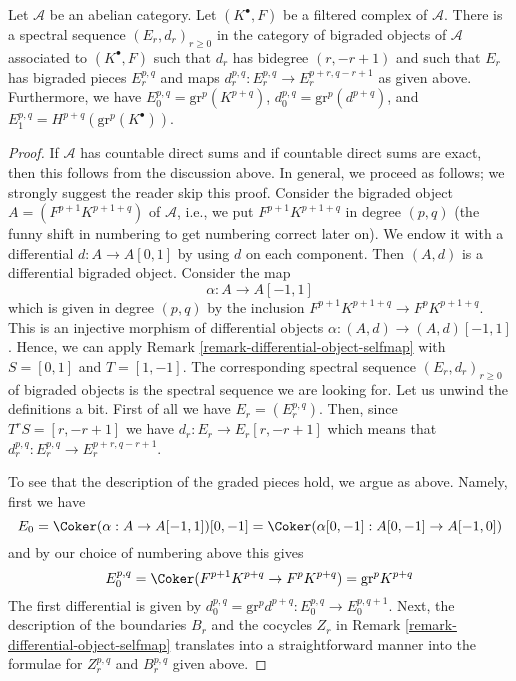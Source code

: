 \begin{lemma}
\label{lemma-spectral-sequence-filtered-complex}
Let $\mathcal{A}$ be an abelian category. Let $(K^\bullet, F)$ be a
filtered complex of $\mathcal{A}$. There is a spectral sequence
$(E_r, d_r)_{r \geq 0}$ in the category of bigraded objects of $\mathcal{A}$
associated to $(K^\bullet, F)$ such that $d_r$ has bidegree $(r, - r + 1)$
and such that $E_r$ has bigraded pieces $E_r^{p, q}$ and maps
$d_r^{p, q} : E_r^{p, q} \to E_r^{p + r, q - r + 1}$ as given above.
Furthermore, we have $E_0^{p, q} = \text{gr}^p(K^{p + q})$,
$d_0^{p, q} = \text{gr}^p(d^{p + q})$,
and $E_1^{p, q} = H^{p + q}(\text{gr}^p(K^\bullet))$.
\end{lemma}

\begin{proof}
If $\mathcal{A}$ has countable direct sums and if countable direct
sums are exact, then this follows from the discussion above.
In general, we proceed as follows; we strongly suggest the reader
skip this proof. Consider the bigraded object $A = (F^{p + 1}K^{p + 1 + q})$
of $\mathcal{A}$, i.e., we put $F^{p + 1}K^{p + 1 + q}$ in degree $(p, q)$
(the funny shift in numbering to get numbering correct later on).
We endow it with a differential $d : A \to A[0, 1]$ by using $d$
on each component. Then $(A, d)$ is a differential bigraded object.
Consider the map
$$
\alpha : A \to A[-1, 1]
$$
which is given in degree $(p, q)$ by the inclusion
$F^{p + 1}K^{p + 1 + q} \to F^pK^{p + 1 + q}$.
This is an injective morphism of differential objects
$\alpha : (A, d) \to (A, d)[-1, 1]$. Hence, we can apply
Remark \ref{remark-differential-object-selfmap}
with $S = [0, 1]$ and $T = [1, -1]$.
The corresponding spectral sequence $(E_r, d_r)_{r \geq 0}$
of bigraded objects is the spectral sequence we are looking
for. Let us unwind the definitions a bit. First of all we have
$E_r = (E_r^{p, q})$. Then, since $T^rS = [r, -r + 1]$
we have $d_r : E_r \to E_r[r, -r + 1]$ which means that
$d_r^{p, q} : E_r^{p, q} \to E_r^{p + r, q - r + 1}$.

\medskip\noindent
To see that the description of the graded pieces hold, we argue
as above. Namely, first we have
$$
E_0 = \Coker(\alpha : A \to A[-1, 1])[0, -1] =
\Coker(\alpha[0, -1] : A[0, -1] \to A[-1, 0])
$$
and by our choice of numbering above this gives
$$
E_0^{p, q} = \Coker(F^{p + 1}K^{p + q} \to F^pK^{p + q}) = \text{gr}^pK^{p + q}
$$
The first differential is given by
$d_0^{p, q} = \text{gr}^pd^{p + q} : E_0^{p, q} \to E_0^{p, q + 1}$.
Next, the description of the boundaries $B_r$ and the cocycles $Z_r$
in Remark \ref{remark-differential-object-selfmap}
translates into a straightforward manner into the formulae
for $Z_r^{p, q}$ and $B_r^{p, q}$ given above.
\end{proof}

